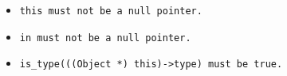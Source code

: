 \begin{itemize}[nosep]

\item \tt{this} must not be a null pointer.

\item \tt{in}   must not be a null pointer.

\item \tt{is_type(((Object *) this)->type)} must be \tt{true}.

\end{itemize}
